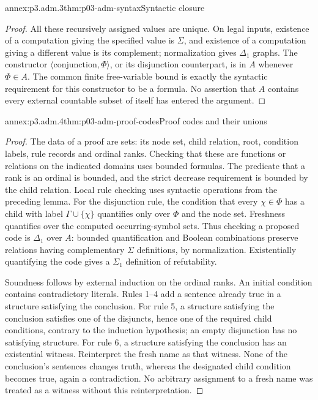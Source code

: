 \begin{annexitem}{annex:p3.adm.3}{thm:p03-adm-syntax}{Syntactic closure}
\begin{proof}
All these recursively assigned values are unique. On legal inputs,
existence of a computation giving the specified value is \(\Sigma\),
and existence of a computation giving a different value is its
complement; normalization gives \(\Delta_1\) graphs. The constructor
\(\langle\text{conjunction},\Phi\rangle\), or its disjunction counterpart,
is in \(A\) whenever \(\Phi\in A\). The common finite free-variable
bound is exactly the syntactic requirement for this constructor to be
a formula. No assertion that \(A\) contains every external countable
subset of itself has entered the argument.
\end{proof}
\end{annexitem}

\begin{annexitem}{annex:p3.adm.4}{thm:p03-adm-proof-codes}{Proof codes and their unions}
\begin{proof}
The data of a proof are sets: its node set, child relation, root,
condition labels, rule records and ordinal ranks. Checking that these
are functions or relations on the indicated domains uses bounded
formulas. The predicate that a rank is an ordinal is bounded, and the
strict decrease requirement is bounded by the child relation. Local
rule checking uses syntactic operations from the preceding lemma.
For the disjunction rule, the condition that every \(\chi\in\Phi\)
has a child with label \(\Gamma\cup\{\chi\}\) quantifies only over
\(\Phi\) and the node set. Freshness quantifies over the computed
occurring-symbol sets. Thus checking a proposed code is \(\Delta_1\)
over \(A\): bounded quantification and Boolean combinations preserve
relations having complementary \(\Sigma\) definitions, by normalization.
Existentially quantifying the code gives a \(\Sigma_1\) definition of
refutability.

Soundness follows by external induction on the ordinal ranks. An
initial condition contains contradictory literals. Rules 1--4 add a
sentence already true in a structure satisfying the conclusion. For
rule 5, a structure satisfying the conclusion satisfies one of the
disjuncts, hence one of the required child conditions, contrary to the
induction hypothesis; an empty disjunction has no satisfying structure.
For rule 6, a structure satisfying the conclusion has an existential
witness. Reinterpret the fresh name as that witness. None of the
conclusion's sentences changes truth, whereas the designated child
condition becomes true, again a contradiction. No arbitrary assignment
to a fresh name was treated as a witness without this reinterpretation.


\end{proof}
\end{annexitem}
